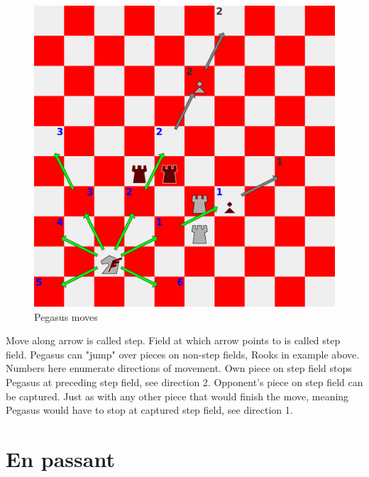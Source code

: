 \documentclass[a5paper,12pt,draft]{book} %
\begin{document}
\noindent
\begin{figure}[!t]
\includegraphics[width=1.0\textwidth, keepaspectratio=true]{../gfx/examples/03_move_pegasus.png}
\caption{Pegasus moves}
\label{fig:pegasus_moves}
\end{figure}
\indent
Move along arrow is called step. Field at which arrow points to is called step field.
Pegasus can "jump" over pieces on non-step fields, Rooks in example above. Numbers
here enumerate directions of movement. Own piece on step field stops Pegasus at
preceding step field, see direction 2. Opponent's piece on step field can be captured.
Just as with any other piece that would finish the move, meaning Pegasus would have to
stop at captured step field, see direction 1.

\clearpage

\section*{En passant}
\end{document}
